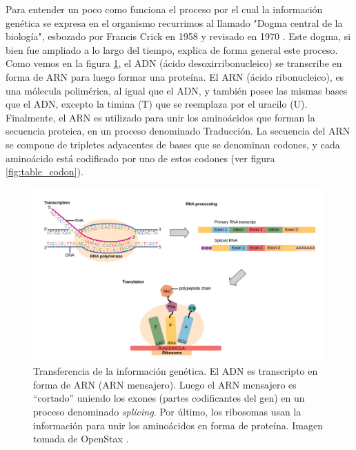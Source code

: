 Para entender un poco como funciona el proceso por el cual la información genética se expresa en el organismo recurrimos al llamado "Dogma central de la biología", esbozado por Francis Crick en 1958 \cite{CRICK1958} y revisado en 1970 \cite{CRICK1970}. Este dogma, si bien fue ampliado a lo largo del tiempo, explica de forma general este proceso. Como vemos en la figura \ref{fig:esquema_dogma}, el ADN (ácido desoxirribonucleico) se transcribe en forma de ARN para luego formar una proteína. El ARN (ácido ribonucleico), es una mólecula polimérica, al igual que el ADN, y también posee las mismas bases que el ADN, excepto la timina (T) que se reemplaza por el uracilo (U). Finalmente, el ARN es utilizado para unir los aminoácidos que forman la secuencia proteica, en un proceso denominado Traducción. La secuencia del ARN se compone de tripletes adyacentes de bases que se denominan codones, y cada aminoácido está codificado por uno de estos codones (ver figura \ref{fig:table_codon}). 

\newpage

\begin{figure}[H]
\centering
    \includegraphics[width=\textwidth]{documents/latex/figures/1/dogma.png}
    \caption{Transferencia de la información genética. El ADN es transcripto en forma de ARN (ARN mensajero). Luego el ARN mensajero es ``cortado'' uniendo los exones (partes codificantes del gen) en un proceso denominado \textit{splicing}. Por último, los ribosomas usan la información para unir los aminoácidos en forma de proteína. Imagen tomada de OpenStax \cite{OpenStaxCNX}.}
    \label{fig:esquema_dogma}
\end{figure}

